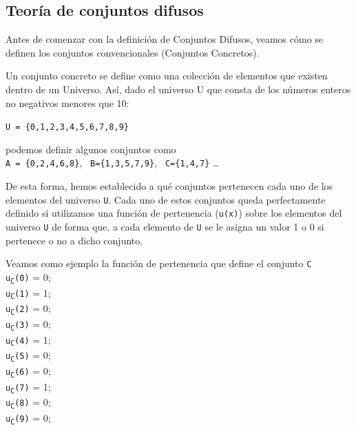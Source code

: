 \subsection{Teoría de conjuntos difusos}
Antes de comenzar con la definición de Conjuntos Difusos, veamos cómo se definen los conjuntos convencionales (Conjuntos Concretos).

Un conjunto concreto se define como una colección de elementos que
existen dentro de un Universo. Así, dado el universo U que consta de los números enteros no negativos menores que 10:

\texttt{U = \{0,1,2,3,4,5,6,7,8,9\}}

podemos definir algunos conjuntos como\\
\newline
\null\hspace{0.59cm}\texttt{A = \{0,2,4,6,8\}},\newline
\null\hspace{0.37cm}\texttt{ B=\{1,3,5,7,9\}},\newline
\null\hspace{0.37cm}\texttt{ C=\{1,4,7\}} \ldots

De esta forma, hemos establecido a qué conjuntos pertenecen cada uno de los elementos del universo \texttt{U}. Cada uno de estos conjuntos queda perfectamente definido si utilizamos una función de pertenencia (\texttt{u(x)}) sobre los elementos del universo \texttt{U} de forma que, a cada elemento de \texttt{U} se le asigna un valor 1 o 0 si pertenece o no a dicho conjunto.

Veamos como ejemplo la función de pertenencia que define el conjunto \texttt{C}
\\ \newline
\null\hspace{0.59cm}\texttt{u\textsubscript{C}(0)} = 0;\\
\null\hspace{0.59cm}\texttt{u\textsubscript{C}(1)} = 1;\\
\null\hspace{0.59cm}\texttt{u\textsubscript{C}(2)} = 0;\\
\null\hspace{0.59cm}\texttt{u\textsubscript{C}(3)} = 0;\\
\null\hspace{0.59cm}\texttt{u\textsubscript{C}(4)} = 1;\\
\null\hspace{0.59cm}\texttt{u\textsubscript{C}(5)} = 0;\\
\null\hspace{0.59cm}\texttt{u\textsubscript{C}(6)} = 0;\\
\null\hspace{0.59cm}\texttt{u\textsubscript{C}(7)} = 1;\\
\null\hspace{0.59cm}\texttt{u\textsubscript{C}(8)} = 0;\\
\null\hspace{0.59cm}\texttt{u\textsubscript{C}(9)} = 0;

